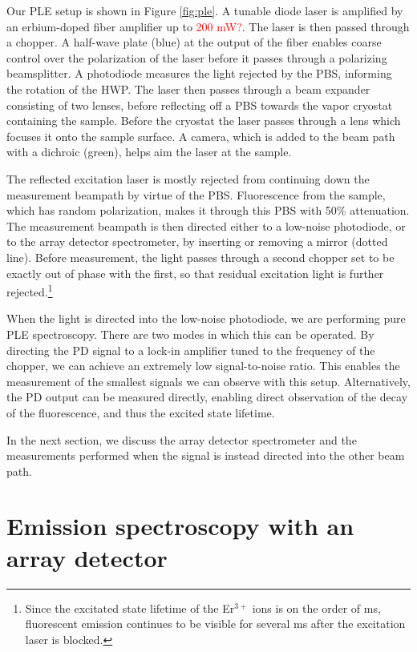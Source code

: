 \documentclass[12pt]{puthesis}
\newcommand{\erbium}[1][ ]{Er$^{3+}$#1}
\newcommand{\notetoself}[1]{\textcolor{red}{#1}}
\begin{document}
Our PLE setup is shown in Figure \ref{fig:ple}. A tunable diode laser is amplified by an erbium-doped fiber amplifier up to \notetoself{200 mW?}. The laser is then passed through a chopper. A half-wave plate (blue) at the output of the fiber enables coarse control over the polarization of the laser before it passes through a polarizing beamsplitter. A photodiode measures the light rejected by the PBS, informing the rotation of the HWP. The laser then passes through a beam expander consisting of two lenses, before reflecting off a PBS towards the vapor cryostat containing the sample. Before the cryostat the laser passes through a lens which focuses it onto the sample surface. A camera, which is added to the beam path with a dichroic (green), helps aim the laser at the sample.

The reflected excitation laser is mostly rejected from continuing down the measurement beampath by virtue of the PBS. Fluorescence from the sample, which has random polarization, makes it through this PBS with 50\% attenuation. The measurement beampath is then directed either to a low-noise photodiode, or to the array detector spectrometer, by inserting or removing a mirror (dotted line). Before measurement, the light passes through a second chopper set to be exactly out of phase with the first, so that residual excitation light is further rejected.\footnote{Since the excitated state lifetime of the \erbium ions is on the order of ms, fluorescent emission continues to be visible for several ms after the excitation laser is blocked.}

When the light is directed into the low-noise photodiode, we are performing pure PLE spectroscopy. There are two modes in which this can be operated. By directing the PD signal to a lock-in amplifier tuned to the frequency of the chopper, we can achieve an extremely low signal-to-noise ratio. This enables the measurement of the smallest signals we can observe with this setup. Alternatively, the PD output can be measured directly, enabling direct observation of the decay of the fluorescence, and thus the excited state lifetime.

In the next section, we discuss the array detector spectrometer and the measurements performed when the signal is instead directed into the other beam path.

\section{Emission spectroscopy with an array detector}
\label{sec:emiss-spectr-with}
\end{document}

